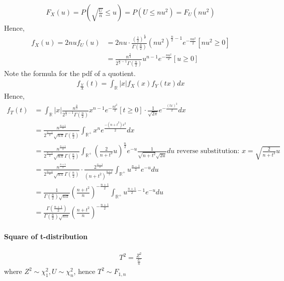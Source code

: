 \documentclass[a4paper]{article}
\newcommand{\rbracket}[1]{\left(#1\right)}
\newcommand{\real}[0]{\mathbb{R}} %
\begin{document}
\begin{align*}
	F_{X}(u) = P(\sqrt{\frac{U}{n}}\leq u) = P(U\leq nu^2) = F_U(nu^2)
\end{align*}
Hence,
\begin{align*}
	f_{X}(u) = 2nu f_U(u) &= 2nu\cdot \frac{\rbracket{\frac{1}{2}}^{\frac{n}{2}}}{\Gamma\rbracket{\frac{n}{2}}} (nu^2)^{\frac{n}{2}-1}e^{-\frac{nu^2}{2}} [nu^2\geq 0]\\
	&= \frac{n^{\frac{n}{2}}}{2^{\frac{n}{2}-1}\Gamma\rbracket{\frac{n}{2}}}u^{n-1}e^{-\frac{nu^2}{2}}[u\geq 0]
\end{align*}
Note the formula for the pdf of a quotient.
\begin{align*}
	f_{\frac{Y}{X}}(t) = \int_\real |x|f_X(x)f_Y(tx)dx
\end{align*}
Hence,
\begin{align*}
	f_T(t) &= \int_\real |x|\frac{n^{\frac{n}{2}}}{2^{\frac{n}{2}-1}\Gamma\rbracket{\frac{n}{2}}}x^{n-1}e^{-\frac{nt^2}{2}}[t\geq 0]\cdot \frac{1}{\sqrt{2\pi}}e^{-\frac{(tx)^2}{2}}dx\\
	&= \frac{n^{\frac{n+1}{2}}}{2^{\frac{n-1}{2}}\sqrt{n\pi}\Gamma\rbracket{\frac{n}{2}}} \int_{\real^+} x^ne^{\frac{-(n+t^2)x^2}{2}}dx\\
	&= \frac{n^{\frac{n+1}{2}}}{2^{\frac{n-1}{2}}\sqrt{n\pi}\Gamma\rbracket{\frac{n}{2}}} \int_{\real^+} \rbracket{\frac{2}{n+t^2}u}^{\frac{n}{2}}e^{-u}\frac{1}{\sqrt{n+t^2}\sqrt{2u}}du \text{ reverse substitution: } x=\sqrt{\frac{2}{n+t^2}u}\\
	&=\frac{n^{\frac{n+1}{2}}}{2^{\frac{n-1}{2}}\sqrt{n\pi}\Gamma\rbracket{\frac{n}{2}}}\cdot \frac{2^{\frac{n-1}{2}}}{(n+t^2)^{\frac{n+1}{2}}}\int_{\real^+}u^{\frac{n-1}{2}}e^{-u}du\\
	&=\frac{1}{\Gamma\rbracket{\frac{n}{2}}\sqrt{n\pi}}\rbracket{\frac{n+t^2}{n}}^{-\frac{n+1}{2}}\int_{\real^+}u^{\frac{n+1}{2}-1}e^{-u}du\\
	&=\frac{\Gamma\rbracket{\frac{n+1}{2}}}{\Gamma\rbracket{\frac{n}{2}}\sqrt{n\pi}}\rbracket{\frac{n+t^2}{n}}^{-\frac{n+1}{2}}
\end{align*}

\paragraph{Square of t-distribution}
\begin{align*}
	T^2 = \frac{Z^2}{\frac{U}{n}}
\end{align*}
where $Z^2\sim \chi_1^2, U\sim \chi_n^2$, hence $T^2\sim F_{1,n}$
\end{document}
